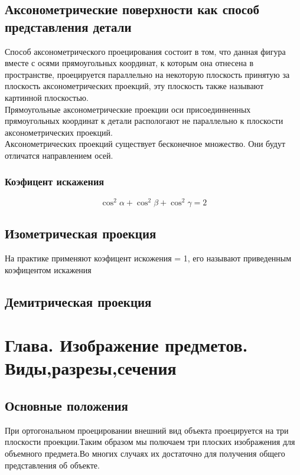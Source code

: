 \documentclass[a4paper, 12pt]{article}
\begin{document}
\subsection{Аксонометрические поверхности как способ представления детали}
Способ аксонометрического проецирования состоит в том, что данная фигура вместе с осями прямоугольных координат, к которым она отнесена в пространстве, проецируется параллельно на некоторую плоскость принятую за плоскость аксонометрических проекций, эту плоскость также называют картинной плоскостью.\\

Прямоугольные аксонометрические проекции оси присоединненных прямоугольных координат к детали распологают не параллельно к плоскости аксонометрических проекций.\\

Аксонометрических проекций существует бесконечное множество. Они будут отличатся направлением осей.\\

\subsubsection*{Коэфицент искажения}
\[
	\cos^2 \alpha + \cos^2 \beta + \cos^2 \gamma = 2
\]

\subsection{Изометрическая проекция}

На практике применяют коэфицент искожения = 1, его называют приведенным коэфицентом искажения

\subsection{Демитрическая проекция}

\newpage
\section{Глава. Изображение предметов.\\Виды,разрезы,сечения}

\subsection{Основные положения}
При ортогональном проецировании внешний вид объекта проецируется на три плоскости проекции.Таким образом мы полючаем три плоских изображения для объемного предмета.Во многих случаях их достаточно для получения общего представления об объекте.\\
\end{document}
